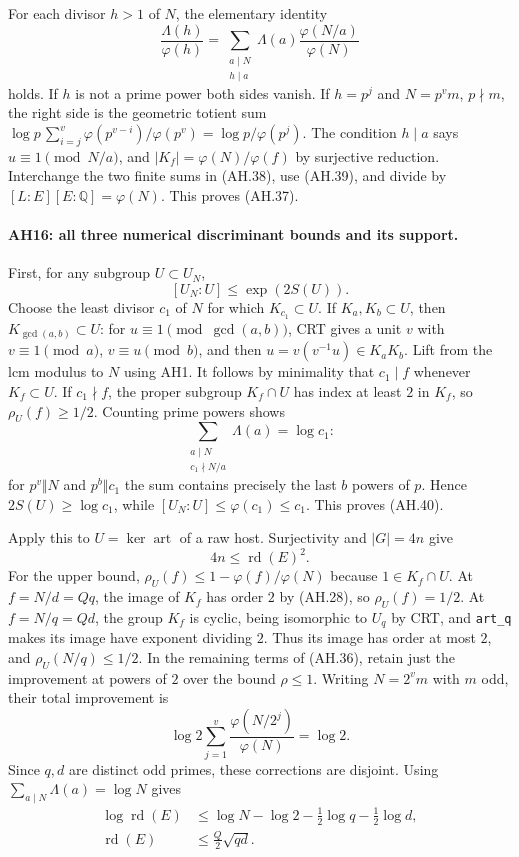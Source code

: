For each divisor $h>1$ of $N$, the elementary identity
\[
 \frac{\Lambda(h)}{\varphi(h)}
   =\sum_{\substack{a\mid N\\h\mid a}}
             \Lambda(a)\frac{\varphi(N/a)}{\varphi(N)}           \tag{AH.39}
\]
holds. If $h$ is not a prime power both sides vanish. If $h=p^j$ and
$N=p^v m$, $p\nmid m$, the right side is the geometric totient sum
$\log p\,\sum_{i=j}^v\varphi(p^{v-i})/\varphi(p^v)
=\log p/\varphi(p^j)$.
The condition $h\mid a$ says $u\equiv1\pmod{N/a}$, and
$|K_f|=\varphi(N)/\varphi(f)$ by surjective reduction.
Interchange the two finite sums in (AH.38), use (AH.39), and divide by
$[L:E][E:\mathbb Q]=\varphi(N)$. This proves (AH.37).

\paragraph{AH16: all three numerical discriminant bounds and its support.}
First, for any subgroup $U\subset U_N$,
\[
                  [U_N:U]\le\exp(2S(U)).        \tag{AH.40}
\]
Choose the least divisor $c_1$ of $N$ for which $K_{c_1}\subset U$.
If $K_a,K_b\subset U$, then $K_{\gcd(a,b)}\subset U$:
for $u\equiv1\pmod{\gcd(a,b)}$, CRT gives a unit $v$ with
$v\equiv1\pmod a$, $v\equiv u\pmod b$, and then
$u=v(v^{-1}u)\in K_aK_b$. Lift from the lcm modulus to $N$ using AH1.
It follows by minimality that $c_1\mid f$ whenever $K_f\subset U$.
If $c_1\nmid f$, the proper subgroup $K_f\cap U$ has index at least $2$
in $K_f$, so $\rho_U(f)\ge1/2$. Counting prime powers shows
\[
 \sum_{\substack{a\mid N\\c_1\nmid N/a}}\Lambda(a)=\log c_1:
\]
for $p^v\Vert N$ and $p^b\Vert c_1$ the sum contains precisely the last
$b$ powers of $p$. Hence $2S(U)\ge\log c_1$, while
$[U_N:U]\le\varphi(c_1)\le c_1$. This proves (AH.40).

Apply this to $U=\ker\operatorname{art}$ of a raw host.
Surjectivity and $|G|=4n$ give
\[
                         4n\le\operatorname{rd}(E)^2.           \tag{AH.41}
\]
For the upper bound, $\rho_U(f)\le1-\varphi(f)/\varphi(N)$ because
$1\in K_f\cap U$. At $f=N/d=Qq$, the image of $K_f$ has order $2$ by
(AH.28), so $\rho_U(f)=1/2$. At $f=N/q=Qd$, the group $K_f$ is cyclic,
being isomorphic to $U_q$ by CRT, and \texttt{art\_q} makes its image
have exponent dividing $2$. Thus its image has order at most $2$, and
$\rho_U(N/q)\le1/2$. In the remaining terms of (AH.36), retain just the
improvement at powers of $2$ over the bound $\rho\le1$.
Writing $N=2^v m$ with $m$ odd, their total improvement is
\[
 \log2\sum_{j=1}^v\frac{\varphi(N/2^j)}{\varphi(N)}
       =\log2.
\]
Since $q,d$ are distinct odd primes, these corrections are disjoint.
Using $\sum_{a\mid N}\Lambda(a)=\log N$ gives
\[
 \begin{split}
 \log\operatorname{rd}(E)
 &\le\log N-\log2-\tfrac12\log q-\tfrac12\log d,\\
 \operatorname{rd}(E)&\le\frac Q2\sqrt{qd}.       \tag{AH.42}
 \end{split}
\]

